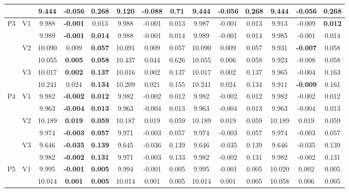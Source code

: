 \documentclass[12pt,a4paper]{article}
\begin{document}
\begin{sidewaystable}[ht]
{\begin{tabular}{cc|ccc|ccc|ccc|ccc|}
   &  & 9.444 & \textbf{-0.056} & \textbf{0.268} & 9.120 & -0.088 & 0.71 & 9.444 & -0.056 & 0.268 & 9.444 & -0.056 & 0.268 \\ 
   \hline \hline\multirow{6}{*}{P3} & \multirow{2}{*}{V1} & 9.988 & \textbf{-0.001} & 0.013 & 9.988 & -0.001 & 0.013 & 9.987 & -0.001 & 0.013 & 9.913 & -0.009 & \textbf{0.012} \\ 
   &  & 9.989 & \textbf{-0.001} & \textbf{0.014} & 9.988 & -0.001 & 0.014 & 9.989 & -0.001 & 0.014 & 9.985 & -0.001 & 0.014 \\ 
   & \multirow{2}{*}{V2} & 10.090 & 0.009 & \textbf{0.057} & 10.091 & 0.009 & 0.057 & 10.090 & 0.009 & 0.057 & 9.931 & \textbf{-0.007} & 0.058 \\ 
   &  & 10.055 & \textbf{0.005} & \textbf{0.058} & 10.437 & 0.044 & 0.626 & 10.055 & 0.006 & 0.058 & 9.923 & -0.008 & 0.058 \\ 
   & \multirow{2}{*}{V3} & 10.017 & \textbf{0.002} & \textbf{0.137} & 10.016 & 0.002 & 0.137 & 10.017 & 0.002 & 0.137 & 9.965 & -0.004 & 0.163 \\ 
   &  & 10.241 & 0.024 & \textbf{0.134} & 10.209 & 0.021 & 0.155 & 10.241 & 0.024 & 0.134 & 9.911 & \textbf{-0.009} & 0.161 \\ 
   \hline \hline\multirow{6}{*}{P4} & \multirow{2}{*}{V1} & 9.982 & \textbf{-0.002} & \textbf{0.012} & 9.982 & -0.002 & 0.012 & 9.982 & -0.002 & 0.012 & 9.982 & -0.002 & 0.012 \\ 
   &  & 9.963 & \textbf{-0.004} & \textbf{0.013} & 9.963 & -0.004 & 0.013 & 9.963 & -0.004 & 0.013 & 9.963 & -0.004 & 0.013 \\ 
   & \multirow{2}{*}{V2} & 10.189 & \textbf{0.019} & \textbf{0.059} & 10.187 & 0.019 & 0.059 & 10.189 & 0.019 & 0.059 & 10.189 & 0.019 & 0.059 \\ 
   &  & 9.974 & \textbf{-0.003} & \textbf{0.057} & 9.971 & -0.003 & 0.057 & 9.974 & -0.003 & 0.057 & 9.974 & -0.003 & 0.057 \\ 
   & \multirow{2}{*}{V3} & 9.646 & \textbf{-0.035} & \textbf{0.139} & 9.645 & -0.036 & 0.139 & 9.646 & -0.035 & 0.139 & 9.646 & -0.035 & 0.139 \\ 
   &  & 9.982 & \textbf{-0.002} & \textbf{0.131} & 9.971 & -0.003 & 0.133 & 9.982 & -0.002 & 0.131 & 9.982 & -0.002 & 0.131 \\ 
   \hline \hline\multirow{6}{*}{P5} & \multirow{2}{*}{V1} & 9.995 & \textbf{-0.001} & \textbf{0.005} & 9.994 & -0.001 & 0.005 & 9.995 & -0.001 & 0.005 & 10.020 & 0.002 & 0.005 \\ 
   &  & 10.014 & \textbf{0.001} & \textbf{0.005} & 10.014 & 0.001 & 0.005 & 10.014 & 0.001 & 0.005 & 10.058 & 0.006 & 0.005 \\ 

\end{tabular}}
\end{sidewaystable}
\end{document}

